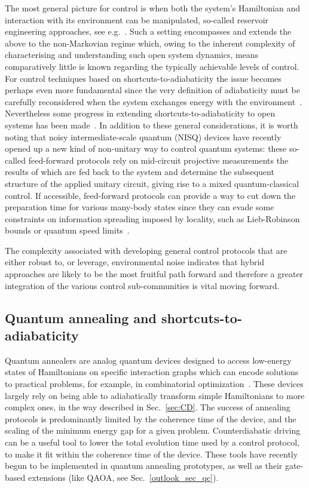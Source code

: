 The most general picture for control is when both the system's Hamiltonian and interaction with its environment can be manipulated, so-called reservoir engineering approaches, see e.g.~\cite{Kapit2017ResEng}. Such a setting encompasses and extends the above to the non-Markovian regime which, owing to the inherent complexity of characterising and understanding such open system dynamics, means comparatively little is known regarding the typically achievable levels of control. For control techniques based on shortcuts-to-adiabaticity the issue becomes perhaps even more fundamental since the very definition of adiabaticity must be carefully reconsidered when the system exchanges energy with the environment~\cite{AdiabaticityOpenSys1, AdiabaticityOpenSys2}. Nevertheless some progress in extending shortcuts-to-adiabaticity to open systems has been made~\cite{VacantiNJP, JunJing1}. In addition to these general considerations, it is worth noting that noisy intermediate-scale quantum (NISQ) devices have recently opened up a new kind of non-unitary way to control quantum systems: these so-called feed-forward protocols rely on mid-circuit projective measurements the results of which are fed back to the system and determine the subsequent structure of the applied unitary circuit, giving rise to a mixed quantum-classical control. If accessible, feed-forward protocols can provide a way to cut down the preparation time for various many-body states since they can evade some constraints on information spreading imposed by locality, such as Lieb-Robinson bounds or quantum speed limits~\cite{verresen2021efficiently,piroliquantum2021,smith2023deterministic,zhu2023nishimori,smith2024constant,iqbal2024topological}. 

The complexity associated with developing general control protocols that are either robust to, or leverage, environmental noise indicates that hybrid approaches are likely to be the most fruitful path forward and therefore a greater integration of the various control sub-communities is vital moving forward.


\subsection{Quantum annealing and shortcuts-to-adiabaticity}
Quantum annealers are analog quantum devices designed to access low-energy states of  Hamiltonians on specific interaction graphs which can encode solutions to practical problems, for example, in combinatorial optimization~\cite{AdiabaticComp}. These devices largely rely on being able to adiabatically transform simple Hamiltonians to more complex ones, in the way described in Sec.~\ref{sec:CD}. The success of annealing protocols is predominantly limited by the coherence time of the device, and the scaling of the minimum energy gap for a given problem. Counterdiabatic driving can be a useful tool to lower the total evolution time used by a control protocol, to make it fit within the coherence time of the device. These tools have recently begun to be implemented in quantum annealing prototypes, as well as their gate-based extensions (like QAOA, see Sec.~\ref{outlook_sec_qc}).

